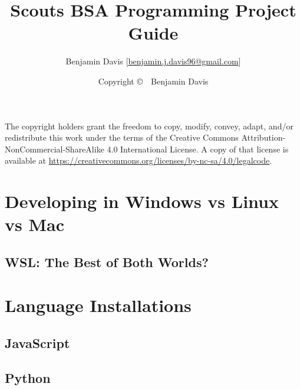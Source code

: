 \documentclass[letterpaper,12pt]{book}
\title{Scouts BSA Programming Project Guide}
\author{
  Benjamin Davis [\href{mailto:benjamin.j.davis96@gmail.com}{benjamin.j.davis96@gmail.com}]
}
\date{Copyright \copyright\ \the\year\ Benjamin Davis}
\begin{document}
  \pagestyle{simple}
  \maketitle
  
  \begin{center}
    \vspace*{\fill}
    The copyright holders grant the freedom to copy, modify, convey, adapt, and/or redistribute this work
    under the terms of the Creative Commons Attribution-NonCommercial-ShareAlike 4.0
    International License. A copy of that license is available at
    \url{https://creativecommons.org/licenses/by-nc-sa/4.0/legalcode}.
    \vspace*{\fill}
  \end{center}

  \frontmatter
  \pagestyle{plain}

  \tableofcontents

  \mainmatter

  

  

  

  

\appendix

  \chapter{Developing in Windows vs Linux vs Mac}
  \label{app:dev_os}

    \section{WSL: The Best of Both Worlds?}

  \chapter{Language Installations}
  \label{app:lang_installations}

    \section{JavaScript}

    \section{Python}
\end{document}
